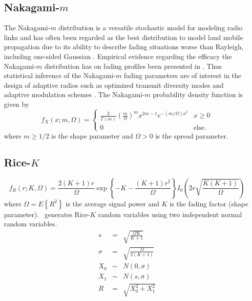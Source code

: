 % 
%
\subsection{Nakagami-$m$}
\label{module:random:nakagamim}
The Nakagami-$m$ distribution is a versatile stochastic model for
modeling radio links \cite{Braun:1991} and has often been regarded as the
best distribution to model land mobile propagation due to its ability to
describe fading situations worse than Rayleigh, including one-sided
Gaussian \cite{Simon:1998}.
Empirical evidence regarding the efficacy the Nakagami-$m$ distribution
has on fading profiles been presented in \cite{Turin:1980, Suzuki:1977}.
Thus statistical inference of the Nakagami-$m$ fading parameters are of
interest in the design of adaptive radios such as optimized transmit
diversity modes \cite{Cavers:1999, Ko:2003} and adaptive modulation schemes
\cite{Catreux:2002}.
The Nakagami-$m$ probability density function is given by
\cite{Papoulis:2002}
%
\begin{equation}
\label{eqn:random:nakagamim:pdf}
    f_X(x;m,\Omega) =
    \begin{cases}
        \frac{2}{\Gamma(m)}
        \left( \frac{m}{\Omega} \right)^m
        x^{2m-1}
        e^{ -(m/\Omega)x^2}             & x \ge 0 \\
        0                               & \text{else}.
    \end{cases}
\end{equation}
%
where
$m \ge 1/2$ is the shape parameter and
$\Omega > 0$ is the spread parameter.


%
%
\subsection{Rice-$K$}
\label{module:random:ricek}
%
\begin{equation}
\label{eqn:random:ricek:pdf}
    f_R(r;K,\Omega) = 
        \frac{2(K+1)r}{\Omega}
        \exp\left\{-K-\frac{(K+1)r^2}{\Omega}\right\}
        I_0\left( 2r\sqrt{\frac{K(K+1)}{\Omega}} \right)
\end{equation}
%
where $\Omega=E\left\{R^2\right\}$ is the average signal power and $K$
is the fading factor (shape parameter).
\liquid\ generates Rice-$K$ random variables using two independent
normal random variables.
%
\begin{eqnarray*}
    s       &=&     \sqrt{\frac{\Omega K}{K+1}}     \\
    \sigma  &=&     \sqrt{\frac{\Omega}{2(K+1)}}    \\
    X_0     &\sim&  N(0,\sigma)                     \\
    X_1     &\sim&  N(s,\sigma)                     \\
    R       &=&      \sqrt{X_0^2 + X_1^2}
\end{eqnarray*}


